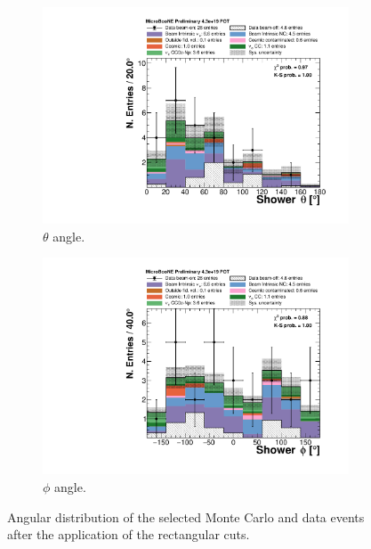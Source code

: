 \begin{figure}
\centering
  \begin{subfigure}{0.48\textwidth}
    \includegraphics[width=\linewidth]{figures/theta_cuts.pdf}
    \caption{$\theta$ angle.} 
  \end{subfigure}
    \begin{subfigure}{0.48\textwidth}
    \includegraphics[width=\linewidth]{figures/phi_cuts.pdf}
    \caption{$\phi$ angle.} 
  \end{subfigure}
  \caption{Angular distribution of the selected Monte Carlo and data events after the application of the rectangular cuts.}
  \label{fig:angle_cuts}
\end{figure}

